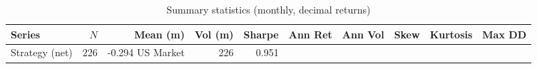 \begin{table}[!ht]
\centering
\caption{Summary statistics (monthly, decimal returns)}
\label{tab:summary_stats}
\begin{tabular}{lrrrrrrrrr}
\toprule
Series & $N$ & Mean (m) & Vol (m) & Sharpe & Ann Ret & Ann Vol & Skew & Kurtosis & Max DD \\
\midrule
Strategy (net) & 226 & -0.294%
US Market & 226 & 0.951%
\bottomrule
\end{tabular}
\end{table}
